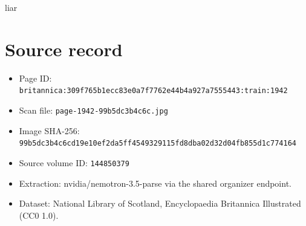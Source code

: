 \documentclass{article}
\begin{document}
liar

\section*{Source record}
\begin{itemize}
\item Page ID: \texttt{britannica:309f765b1ecc83e0a7f7762e44b4a927a7555443:train:1942}
\item Scan file: \texttt{page-1942-99b5dc3b4c6c.jpg}
\item Image SHA-256: \texttt{99b5dc3b4c6cd19e10ef2da5ff4549329115fd8dba02d32d04fb855d1c774164}
\item Source volume ID: \texttt{144850379}
\item Extraction: nvidia/nemotron-3.5-parse via the shared organizer endpoint.
\item Dataset: National Library of Scotland, Encyclopaedia Britannica Illustrated (CC0 1.0).
\end{itemize}
\end{document}
